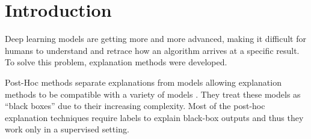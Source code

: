 
\newcommand\blfootnote[1]{%
  \begingroup
  \renewcommand\thefootnote{}\footnote{#1}%
  \addtocounter{footnote}{-1}%
  \endgroup
}

\newcommand{\xmark}{\text{\ding{55}}}
\makeatletter
\newcommand\newtag[2]{#1\def\@currentlabel{#1}\label{#2}}
\makeatother
\newcommand*{\eg}{e.g.\@\xspace}
\newcommand*{\ie}{i.e.\@\xspace}

\section{Introduction}


Deep learning models are getting more and more advanced,  making it difficult for humans to understand and retrace how an algorithm arrives at a specific result. To solve this problem, explanation methods were developed.

Post-Hoc methods separate explanations from models allowing explanation methods to be compatible with a variety of models \citep{xaisurvey}. They treat these models as \enquote{black boxes} due to their increasing complexity. Most of the post-hoc explanation techniques require labels to explain black-box outputs and thus they work only in a supervised setting.

